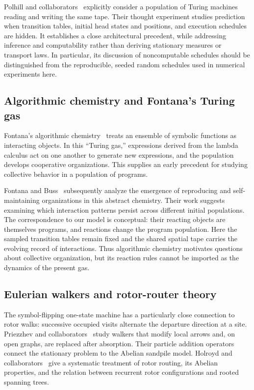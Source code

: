 \documentclass{article}
\begin{document}
Polhill and collaborators~\citep{polhill2021prediction} explicitly consider
a population of Turing machines reading and writing the same tape.  Their
thought experiment studies prediction when transition tables, initial head
states and positions, and execution schedules are hidden.  It establishes
a close architectural precedent, while addressing inference and
computability rather than deriving stationary measures or transport laws.
In particular, its discussion of noncomputable schedules should be
distinguished from the reproducible, seeded random schedules used in
numerical experiments here.

\subsection{Algorithmic chemistry and Fontana's Turing gas}

Fontana's algorithmic chemistry~\citep{fontana1991chemistry} treats an
ensemble of symbolic functions as interacting objects.  In this
``Turing gas,'' expressions derived from the lambda calculus act on one
another to generate new expressions, and the population develops
cooperative organizations.  This supplies an early precedent for studying
collective behavior in a population of programs.

Fontana and Buss~\citep{fontana1994tape} subsequently analyze the emergence
of reproducing and self-maintaining organizations in this abstract
chemistry.  Their work suggests examining which interaction patterns
persist across different initial populations.  The correspondence to our
model is conceptual: their reacting objects are themselves programs, and
reactions change the program population.  Here the sampled transition
tables remain fixed and the shared spatial tape carries the evolving
record of interactions.  Thus algorithmic chemistry motivates questions
about collective organization, but its reaction rules cannot be imported
as the dynamics of the present gas.

\subsection{Eulerian walkers and rotor-router theory}

The symbol-flipping one-state machine has a particularly close connection
to rotor walks: successive occupied visits alternate the departure
direction at a site.  Priezzhev and
collaborators~\citep{priezzhev1996eulerian} study walkers that modify local
arrows and, on open graphs, are replaced after absorption.  Their particle
addition operators connect the stationary problem to the Abelian sandpile
model.  Holroyd and collaborators~\citep{holroyd2008rotor} give a systematic
treatment of rotor routing, its Abelian properties, and the relation
between recurrent rotor configurations and rooted spanning trees.
\end{document}
